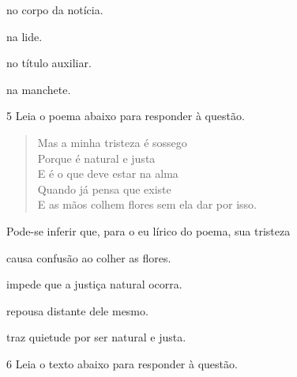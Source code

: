 \begin{multicols}{2}
\begin{escolha}
  
  \item no corpo da notícia.
  
  \item na lide.
  
  \item no título auxiliar.
  
  \item na manchete.

\end{escolha}
\end{multicols}

\num{5} Leia o poema abaixo para responder à questão. 

\begin{myquote}
\begin{verse}

Mas a minha tristeza é sossego \\
Porque é natural e justa \\
E é o que deve estar na alma \\
Quando já pensa que existe \\
E as mãos colhem flores sem ela dar por isso.

\end{verse}


\end{myquote}

Pode-se inferir que, para o eu lírico do poema, sua tristeza

\begin{escolha}

    \item causa confusão ao colher as flores.

    \item impede que a justiça natural ocorra.

    \item repousa distante dele mesmo. 

    \item traz quietude por ser natural e justa. 

\end{escolha}

\num{6} Leia o texto abaixo para responder à questão. 

